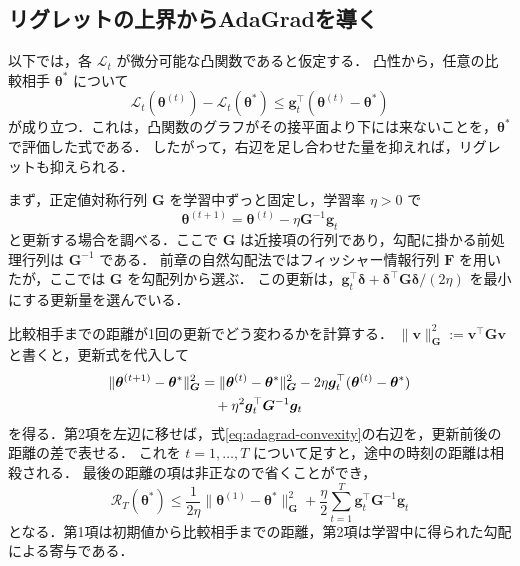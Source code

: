 \documentclass[../main.tex]{subfiles}
\begin{document}
\subsection{リグレットの上界からAdaGradを導く}

以下では，各 $\mathcal{L}_t$ が微分可能な凸関数であると仮定する．
凸性から，任意の比較相手 $\bm{\theta}^*$ について
\begin{equation}
  \mathcal{L}_t(\bm{\theta}^{(t)})-\mathcal{L}_t(\bm{\theta}^*)
  \leq\bm{g}_t^\top(\bm{\theta}^{(t)}-\bm{\theta}^*)
  \label{eq:adagrad-convexity}
\end{equation}
が成り立つ．これは，凸関数のグラフがその接平面より下には来ないことを，$\bm{\theta}^*$ で評価した式である．
したがって，右辺を足し合わせた量を抑えれば，リグレットも抑えられる．

まず，正定値対称行列 $\bm{G}$ を学習中ずっと固定し，学習率 $\eta>0$ で
\begin{equation}
  \bm{\theta}^{(t+1)}=\bm{\theta}^{(t)}-\eta\bm{G}^{-1}\bm{g}_t
  \label{eq:adagrad-fixed-update}
\end{equation}
と更新する場合を調べる．ここで $\bm{G}$ は近接項の行列であり，勾配に掛かる前処理行列は $\bm{G}^{-1}$ である．
前章の自然勾配法ではフィッシャー情報行列 $\bm{F}$ を用いたが，ここでは $\bm{G}$ を勾配列から選ぶ．
この更新は，$\bm{g}_t^\top\bm{\delta}+\bm{\delta}^\top\bm{G}\bm{\delta}/(2\eta)$ を最小にする更新量を選んでいる．

比較相手までの距離が1回の更新でどう変わるかを計算する．
$\|\bm{v}\|_{\bm{G}}^2:=\bm{v}^\top\bm{G}\bm{v}$ と書くと，更新式を代入して
\begin{align}
  \|\bm{\theta}^{(t+1)}-\bm{\theta}^*\|_{\bm{G}}^2
  &=\|\bm{\theta}^{(t)}-\bm{\theta}^*\|_{\bm{G}}^2
  -2\eta\bm{g}_t^\top(\bm{\theta}^{(t)}-\bm{\theta}^*)\notag\\
  &\quad+\eta^2\bm{g}_t^\top\bm{G}^{-1}\bm{g}_t
  \label{eq:adagrad-distance-identity}
\end{align}
を得る．第2項を左辺に移せば，式\eqref{eq:adagrad-convexity}の右辺を，更新前後の距離の差で表せる．
これを $t=1,\ldots,T$ について足すと，途中の時刻の距離は相殺される．
最後の距離の項は非正なので省くことができ，
\begin{equation}
  \mathcal{R}_T(\bm{\theta}^*)
  \leq\frac{1}{2\eta}\|\bm{\theta}^{(1)}-\bm{\theta}^*\|_{\bm{G}}^2
  +\frac{\eta}{2}\sum_{t=1}^T\bm{g}_t^\top\bm{G}^{-1}\bm{g}_t
  \label{eq:adagrad-fixed-regret}
\end{equation}
となる．第1項は初期値から比較相手までの距離，第2項は学習中に得られた勾配による寄与である．
\end{document}
